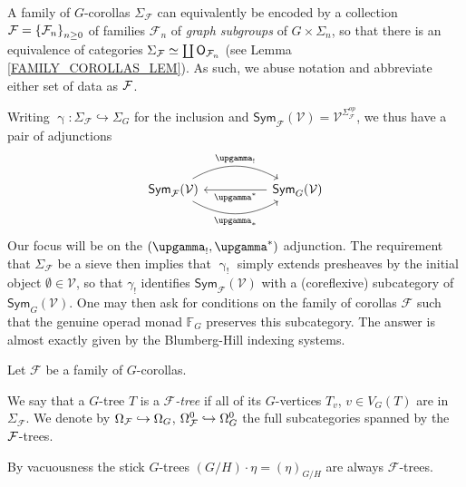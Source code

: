 \documentclass[a4paper,10pt]{article}%
\begin{document}
\begin{remark}\label{FAMILY_COROLLAS_REM}
A family of $G$-corollas $\Sigma_{\mathcal{F}}$
can equivalently be encoded by
a collection $\mathcal F = \left\{\mathcal F_n\right\}_{n \geq 0}$ of 
families $\mathcal F_n$ of \textit{graph subgroups} of $G \times \Sigma_n$, so that there is an equivalence of categories
$\Sigma_{\mathcal F} \simeq \coprod \mathsf{O}_{\mathcal F_n}$ (see Lemma \ref{FAMILY_COROLLAS_LEM}).
	As such, we abuse notation and abbreviate either set of data as $\mathcal F$. 
\end{remark}

Writing 
$\upgamma \colon 
\Sigma_{\mathcal{F}}
\hookrightarrow
\Sigma_G$
for the inclusion and 
$\mathsf{Sym}_{\mathcal{F}}(\mathcal{V}) = 
\mathcal{V}^{\Sigma_{\mathcal{F}}^{op}}$,
we thus have a pair of adjunctions
\begin{equation}\label{F_TWOADJOINTS_EQ}
	\begin{tikzcd}[column sep =5em]
		\mathsf{Sym}_\F(\mathcal{V})
		\arrow[r, bend left, "\upgamma_{!}"]
		\arrow[r, bend right, "\upgamma_{\**}"']
	&
		\mathsf{Sym}_{G}(\mathcal{V}) 
		\arrow[l, "\upgamma^{\**}"] 
	\end{tikzcd}
\end{equation}
Our focus will be on the $(\upgamma_!,\upgamma^{\**})$ adjunction.
The requirement that $\Sigma_{\mathcal{F}}$ be a sieve then implies that $\upgamma_!$ simply extends presheaves by the initial object 
$\emptyset \in \mathcal{V}$,
so that $\gamma_!$ identifies 
$\mathsf{Sym}_{\mathcal{F}}(\mathcal{V})$
with a (coreflexive) subcategory of 
$\mathsf{Sym}_G(\mathcal{V})$.
One may then ask for conditions on the family 
of corollas $\mathcal{F}$ such that 
the genuine operad monad $\mathbb{F}_G$
preserves this subcategory.
The answer is almost exactly given by the Blumberg-Hill indexing systems.


\begin{definition}\label{FTREE DEF}
Let $\mathcal{F}$ be a family of $G$-corollas.

We say that a $G$-tree $T$ is a \textit{$\mathcal{F}$-tree}
if all of its $G$-vertices $T_{v}$, $v \in V_G(T)$ are in 
$\Sigma_{\mathcal{F}}$.
We denote by 
$\Omega_{\mathcal F} \hookrightarrow \Omega_G$,
$\Omega_{\mathcal F}^0 \hookrightarrow \Omega_G^0$
the full subcategories spanned by the $\mathcal F$-trees.
\end{definition}


\begin{remark}\label{VACUOUSNESS REM}
	By vacuousness the stick $G$-trees
	$(G/H) \cdot \eta = (\eta)_{G/H}$ are always $\mathcal{F}$-trees.
\end{remark}
\end{document}
